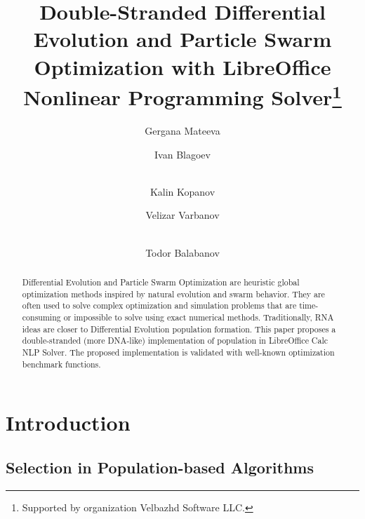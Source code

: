 \documentclass[runningheads]{llncs}
\begin{document}
\title{Double-Stranded Differential Evolution and Particle Swarm Optimization with LibreOffice Nonlinear Programming Solver\thanks{Supported by organization Velbazhd Software LLC.}}


\author{
Gergana Mateeva \and
Ivan Blagoev \and\\
Kalin Kopanov \and
Velizar Varbanov \and\\
Todor Balabanov
}



\maketitle

\begin{abstract}
Differential Evolution and Particle Swarm Optimization are heuristic global optimization methods inspired by natural evolution and swarm behavior. They are often used to solve complex optimization and simulation problems that are time-consuming or impossible to solve using exact numerical methods. Traditionally, RNA ideas are closer to Differential Evolution population formation. This paper proposes a double-stranded (more DNA-like) implementation of population in LibreOffice Calc NLP Solver. The proposed implementation is validated with well-known optimization benchmark functions.

\end{abstract}

\section{Introduction}

\subsection{Selection in Population-based Algorithms}
\end{document}
